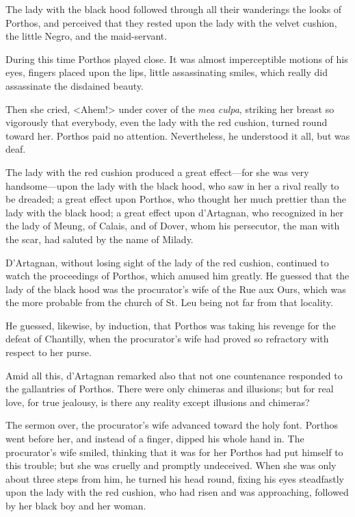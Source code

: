 The lady with the black hood followed through all their wanderings the looks of Porthos, and perceived that they rested upon the lady with the velvet cushion, the little Negro, and the maid-servant. 

During this time Porthos played close. It was almost imperceptible motions of his eyes, fingers placed upon the lips, little assassinating smiles, which really did assassinate the disdained beauty. 

Then she cried, <Ahem!> under cover of the \textit{mea culpa}, striking her breast so vigorously that everybody, even the lady with the red cushion, turned round toward her. Porthos paid no attention. Nevertheless, he understood it all, but was deaf. 

The lady with the red cushion produced a great effect---for she was very handsome---upon the lady with the black hood, who saw in her a rival really to be dreaded; a great effect upon Porthos, who thought her much prettier than the lady with the black hood; a great effect upon d'Artagnan, who recognized in her the lady of Meung, of Calais, and of Dover, whom his persecutor, the man with the scar, had saluted by the name of Milady. 

D'Artagnan, without losing sight of the lady of the red cushion, continued to watch the proceedings of Porthos, which amused him greatly. He guessed that the lady of the black hood was the procurator's wife of the Rue aux Ours, which was the more probable from the church of St. Leu being not far from that locality. 

He guessed, likewise, by induction, that Porthos was taking his revenge for the defeat of Chantilly, when the procurator's wife had proved so refractory with respect to her purse. 

Amid all this, d'Artagnan remarked also that not one countenance responded to the gallantries of Porthos. There were only chimeras and illusions; but for real love, for true jealousy, is there any reality except illusions and chimeras? 

The sermon over, the procurator's wife advanced toward the holy font. Porthos went before her, and instead of a finger, dipped his whole hand in. The procurator's wife smiled, thinking that it was for her Porthos had put himself to this trouble; but she was cruelly and promptly undeceived. When she was only about three steps from him, he turned his head round, fixing his eyes steadfastly upon the lady with the red cushion, who had risen and was approaching, followed by her black boy and her woman. 


